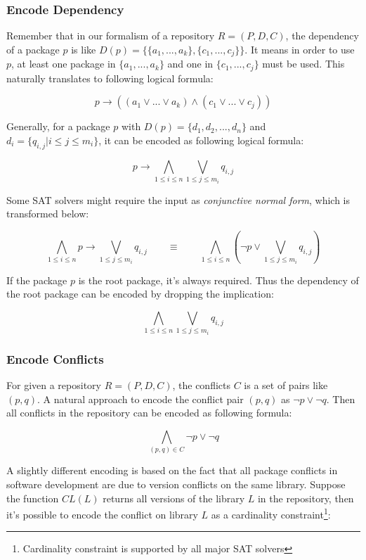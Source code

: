 \subsubsection{Encode Dependency}

Remember that in our formalism of a repository $R = (P, D, C)$, the dependency of a package $p$ is like $D(p) = \{\{a_1, ..., a_k\}, \{c_1, ..., c_j\}\}$. It means in order to use $p$, at least one package in $\{a_1, ..., a_k\}$ and one in $\{c_1, ..., c_j\}$ must be used. This naturally translates to following logical formula:

\[
p \rightarrow ((a_1 \vee ... \vee a_k) \wedge (c_1 \vee ... \vee c_j))
\]

Generally, for a package $p$ with $D(p) = \{ d_1, d_2, ..., d_n\}$ and $d_i = \{ q_{i, j} | i \leq j \leq m_i \}$, it can be encoded as following logical formula:

\[
p \rightarrow \bigwedge_{1 \leq i \leq n} \bigvee_{1 \leq j \leq m_i} q_{i,j}
\]

Some SAT solvers might require the input as \emph{conjunctive normal form}, which is transformed below:

\[
\bigwedge_{1 \leq i \leq n} p \rightarrow \bigvee_{1 \leq j \leq m_i} q_{i,j} \quad \quad \equiv \quad \quad \bigwedge_{1 \leq i \leq n} (\neg p \vee \bigvee_{1 \leq j \leq m_i} q_{i,j})
\]

If the package $p$ is the root package, it's always required. Thus the dependency of the root package can be encoded by dropping the implication:

\[
\bigwedge_{1 \leq i \leq n} \bigvee_{1 \leq j \leq m_i} q_{i,j}
\]

\subsubsection{Encode Conflicts}

For given a repository $R = (P, D, C)$, the conflicts $C$ is a set of pairs like $(p, q)$. A natural approach to encode the conflict pair $(p, q)$ as $\neg p \vee \neg q$. Then all conflicts in the repository can be encoded as following formula:

\[
\bigwedge_{(p, q) \in C} \neg p \vee \neg q
\]

A slightly different encoding is based on the fact that all package conflicts in software development are due to version conflicts on the same library. Suppose the function $CL(L)$ returns all versions of the library $L$ in the repository, then it's possible to encode the conflict on library $L$ as a cardinality constraint\footnote{Cardinality constraint is supported by all major SAT solvers}:

